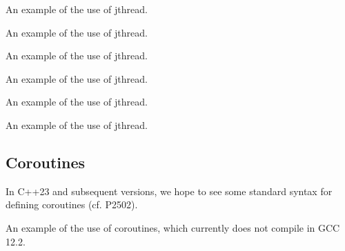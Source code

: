 \raggedbottom
\begin{codebox}[]{\href{https://godbolt.org/z/}{\ExternalLink}}
\footnotesize An example of the use of jthread.
\tcblower
{}
\end{codebox}

\raggedbottom
\begin{codebox}[]{\href{https://godbolt.org/z/}{\ExternalLink}}
\footnotesize An example of the use of jthread.
\tcblower
{}
\end{codebox}

\raggedbottom
\begin{codebox}[]{\href{https://godbolt.org/z/}{\ExternalLink}}
\footnotesize An example of the use of jthread.
\tcblower
{}
\end{codebox}

\raggedbottom
\begin{codebox}[]{\href{https://godbolt.org/z/}{\ExternalLink}}
\footnotesize An example of the use of jthread.
\tcblower
{}
\end{codebox}

\raggedbottom
\begin{codebox}[]{\href{https://godbolt.org/z/}{\ExternalLink}}
\footnotesize An example of the use of jthread.
\tcblower
{}
\end{codebox}

\raggedbottom
\begin{codebox}[]{\href{https://godbolt.org/z/}{\ExternalLink}}
\footnotesize An example of the use of jthread.
\tcblower
{}
\end{codebox}


\subsection{Coroutines}

In C++23 and subsequent versions, we hope to see some standard syntax for defining coroutines (cf. P2502). 

\raggedbottom
\begin{codebox}[]{}
\footnotesize An example of the use of coroutines, which currently does not compile in GCC 12.2.
\tcblower
{}
\end{codebox}

